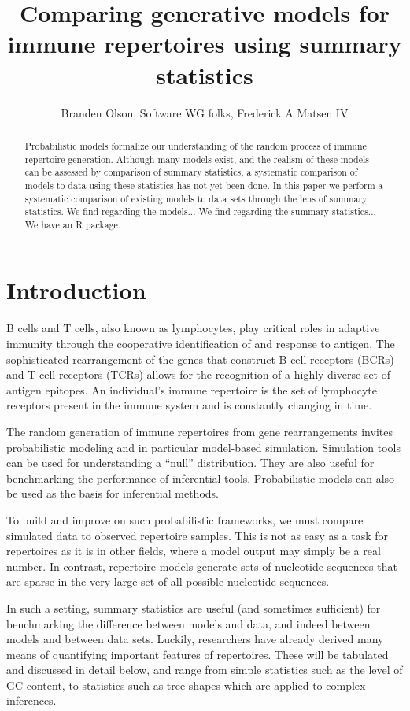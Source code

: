 \documentclass{article}
\title{Comparing generative models for immune repertoires using summary statistics}
\author{Branden Olson, Software WG folks, Frederick A Matsen IV}
\begin{document}
\maketitle

\begin{abstract}
Probabilistic models formalize our understanding of the random process of immune repertoire generation.
Although many models exist, and the realism of these models can be assessed by comparison of summary statistics, a systematic comparison of models to data using these statistics has not yet been done.
In this paper we perform a systematic comparison of existing models to data sets through the lens of summary statistics.
We find regarding the models...
We find regarding the summary statistics...
We have an R package.
\end{abstract}

\section*{Introduction}

B cells and T cells, also known as lymphocytes, play critical roles in adaptive immunity through the cooperative identification of and response to antigen.
The sophisticated rearrangement of the genes that construct B cell receptors (BCRs) and T cell receptors (TCRs) allows for the recognition of a highly diverse set of antigen epitopes.
An individual's immune repertoire is the set of lymphocyte receptors present in the immune system and is constantly changing in time. 

The random generation of immune repertoires from gene rearrangements invites probabilistic modeling and in particular model-based simulation.
Simulation tools can be used for understanding a ``null'' distribution.
They are also useful for benchmarking the performance of inferential tools.
Probabilistic models can also be used as the basis for inferential methods.

To build and improve on such probabilistic frameworks, we must compare simulated data to observed repertoire samples.
This is not as easy as a task for repertoires as it is in other fields, where a model output may simply be a real number.
In contrast, repertoire models generate sets of nucleotide sequences that are sparse in the very large set of all possible nucleotide sequences.

In such a setting, summary statistics are useful (and sometimes sufficient) for benchmarking the difference between models and data, and indeed between models and between data sets.
Luckily, researchers have already derived many means of quantifying important features of repertoires.
These will be tabulated and discussed in detail below, and range from simple statistics such as the level of GC content, to statistics such as tree shapes which are applied to complex inferences.
\end{document}
